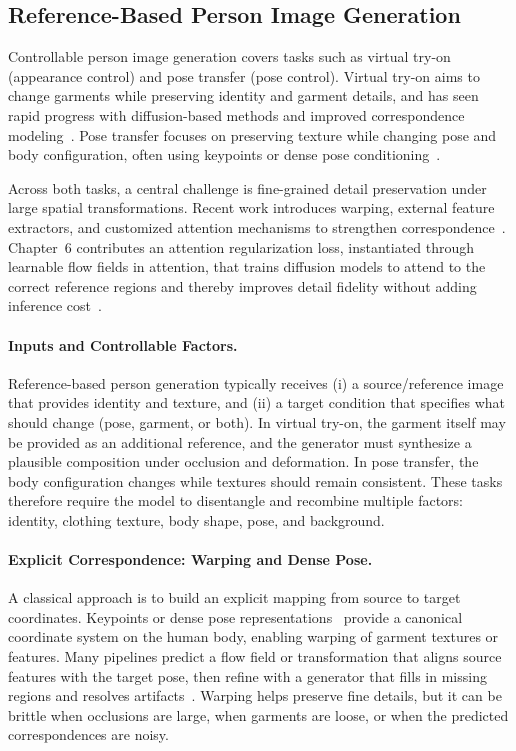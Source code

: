 \subsection{Reference-Based Person Image Generation}
Controllable person image generation covers tasks such as virtual try-on (appearance control) and pose transfer (pose control). Virtual try-on aims to change garments while preserving identity and garment details, and has seen rapid progress with diffusion-based methods and improved correspondence modeling~\citep{choi2021viton, zhu2023tryondiffusion, kim2024stableviton, xu2024ootdiffusion}. Pose transfer focuses on preserving texture while changing pose and body configuration, often using keypoints or dense pose conditioning~\citep{ma2017pose, siarohin2018deformable, guler2018densepose, han2023controllable, lu2024coarse}.

Across both tasks, a central challenge is fine-grained detail preservation under large spatial transformations. Recent work introduces warping, external feature extractors, and customized attention mechanisms to strengthen correspondence~\citep{kim2024stableviton, oquab2023dinov2, zhang2023adding}. Chapter~6 contributes an attention regularization loss, instantiated through learnable flow fields in attention, that trains diffusion models to attend to the correct reference regions and thereby improves detail fidelity without adding inference cost~\citep{zhou2025learning}.

\paragraph{Inputs and Controllable Factors.}
Reference-based person generation typically receives (i) a source/reference image that provides identity and texture, and (ii) a target condition that specifies what should change (pose, garment, or both). In virtual try-on, the garment itself may be provided as an additional reference, and the generator must synthesize a plausible composition under occlusion and deformation. In pose transfer, the body configuration changes while textures should remain consistent. These tasks therefore require the model to disentangle and recombine multiple factors: identity, clothing texture, body shape, pose, and background.

\paragraph{Explicit Correspondence: Warping and Dense Pose.}
A classical approach is to build an explicit mapping from source to target coordinates. Keypoints or dense pose representations~\citep{guler2018densepose} provide a canonical coordinate system on the human body, enabling warping of garment textures or features. Many pipelines predict a flow field or transformation that aligns source features with the target pose, then refine with a generator that fills in missing regions and resolves artifacts~\citep{siarohin2018deformable, han2023controllable}. Warping helps preserve fine details, but it can be brittle when occlusions are large, when garments are loose, or when the predicted correspondences are noisy.

